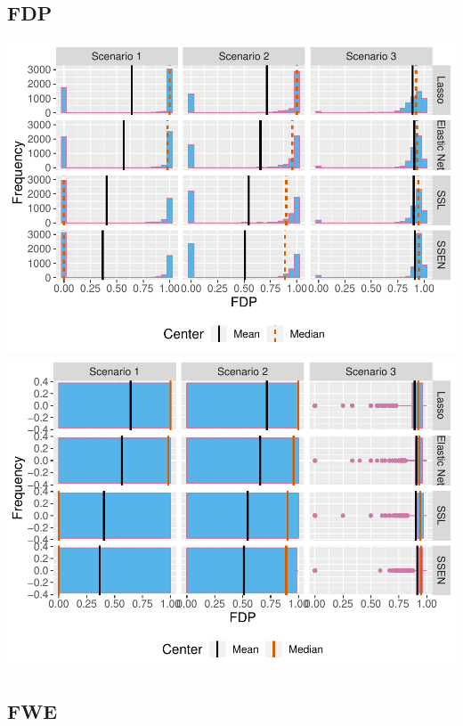 \documentclass[
]{article}
\begin{document}
\hypertarget{fdp}{%
\subsection{FDP}\label{fdp}}

\includegraphics{simulation_results_files/figure-latex/unnamed-chunk-22-1.pdf}
\includegraphics{simulation_results_files/figure-latex/unnamed-chunk-22-2.pdf}

\hypertarget{fwe}{%
\subsection{FWE}\label{fwe}}
\end{document}
